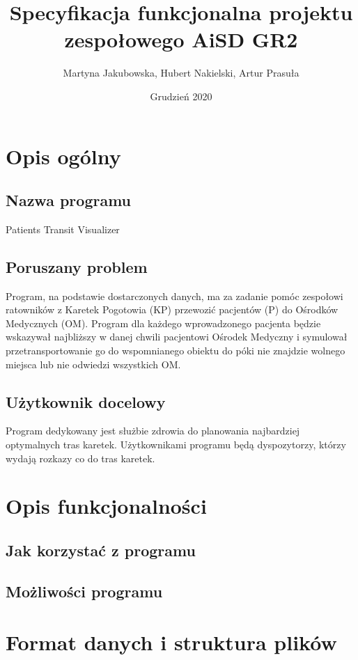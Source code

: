 \documentclass[]{article}
\title{Specyfikacja funkcjonalna projektu zespołowego \textbf{AiSD GR2}}
\author{Martyna Jakubowska, Hubert Nakielski, Artur Prasuła}
\date{Grudzień 2020}
\begin{document}
    \maketitle


    \section{Opis ogólny}

    \subsection{Nazwa programu} %
    Patients Transit Visualizer

    \subsection{Poruszany problem} %
    Program, na podstawie dostarczonych danych, ma za zadanie pomóc zespołowi ratowników z Karetek Pogotowia (KP) przewozić pacjentów (P) do Ośrodków Medycznych (OM). Program dla każdego wprowadzonego pacjenta będzie wskazywał najbliższy w danej chwili pacjentowi Ośrodek Medyczny i symulował przetransportowanie go do wspomnianego obiektu do póki nie znajdzie wolnego miejsca lub nie odwiedzi wszystkich OM.

    \subsection{Użytkownik docelowy}
    Program dedykowany jest służbie zdrowia do planowania najbardziej optymalnych tras karetek.
    Użytkownikami programu będą dyspozytorzy, którzy wydają rozkazy co do tras karetek.


    \section{Opis funkcjonalności}

    \subsection{Jak korzystać z programu} %

    \subsection{Możliwości programu} %


    \section{Format danych i struktura plików}
\end{document}
